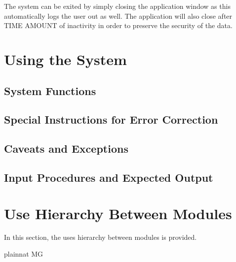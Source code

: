 \documentclass[12pt, titlepage]{article}
\begin{document}
The system can be exited by simply closing the application window as this automatically logs the user out as well. The application will also close after TIME AMOUNT of inactivity in order to preserve the security of the data.


\section{Using the System} \label{SysUse}


\subsection{System Functions} \label{SysFunc}


\subsection{Special Instructions for Error Correction} \label{ErrCorr}

\subsection{Caveats and Exceptions} \label{CavExc}

\subsection{Input Procedures and Expected Output} \label{InOut}



\section{Use Hierarchy Between Modules} \label{SecUse}

In this section, the uses hierarchy between modules is
provided. \citet{Parnas1978} 



 {plainnat}
 {MG}
\end{document}
